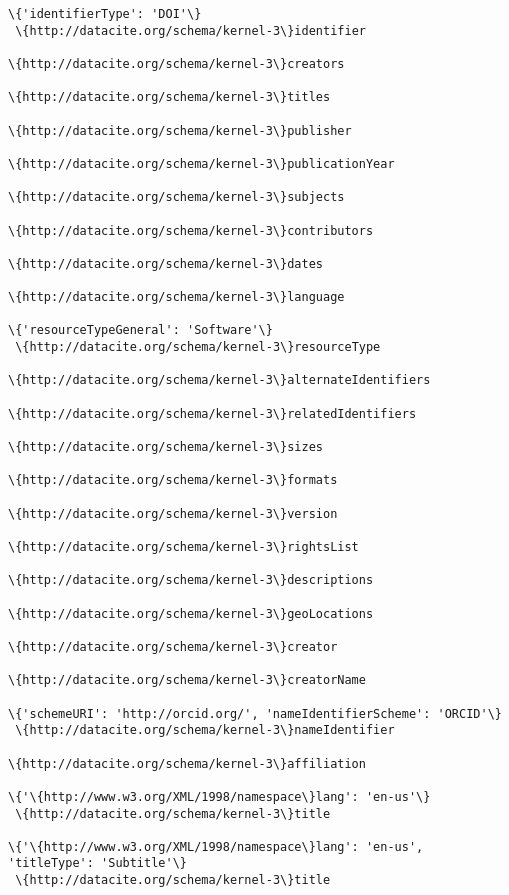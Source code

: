 \documentclass[11pt]{article}
\begin{document}
    \begin{Verbatim}[commandchars=\\\{\}]
\{'identifierType': 'DOI'\} 
 \{http://datacite.org/schema/kernel-3\}identifier 

\{http://datacite.org/schema/kernel-3\}creators 

\{http://datacite.org/schema/kernel-3\}titles 

\{http://datacite.org/schema/kernel-3\}publisher 

\{http://datacite.org/schema/kernel-3\}publicationYear 

\{http://datacite.org/schema/kernel-3\}subjects 

\{http://datacite.org/schema/kernel-3\}contributors 

\{http://datacite.org/schema/kernel-3\}dates 

\{http://datacite.org/schema/kernel-3\}language 

\{'resourceTypeGeneral': 'Software'\} 
 \{http://datacite.org/schema/kernel-3\}resourceType 

\{http://datacite.org/schema/kernel-3\}alternateIdentifiers 

\{http://datacite.org/schema/kernel-3\}relatedIdentifiers 

\{http://datacite.org/schema/kernel-3\}sizes 

\{http://datacite.org/schema/kernel-3\}formats 

\{http://datacite.org/schema/kernel-3\}version 

\{http://datacite.org/schema/kernel-3\}rightsList 

\{http://datacite.org/schema/kernel-3\}descriptions 

\{http://datacite.org/schema/kernel-3\}geoLocations 

\{http://datacite.org/schema/kernel-3\}creator 

\{http://datacite.org/schema/kernel-3\}creatorName 

\{'schemeURI': 'http://orcid.org/', 'nameIdentifierScheme': 'ORCID'\} 
 \{http://datacite.org/schema/kernel-3\}nameIdentifier 

\{http://datacite.org/schema/kernel-3\}affiliation 

\{'\{http://www.w3.org/XML/1998/namespace\}lang': 'en-us'\} 
 \{http://datacite.org/schema/kernel-3\}title 

\{'\{http://www.w3.org/XML/1998/namespace\}lang': 'en-us', 'titleType': 'Subtitle'\} 
 \{http://datacite.org/schema/kernel-3\}title 


\end{Verbatim}
\end{document}
